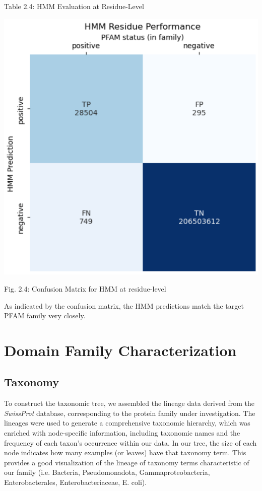 \documentclass[10pt,twocolumn,letterpaper]{article}
\begin{document}
\begin{center}
    \small{Table 2.4: HMM Evaluation at Residue-Level}
\end{center}

\begin{center}
    \includegraphics[scale=0.45]{report/img/hmm_res_performance.png}
\end{center}

\begin{center}
    \small{Fig. 2.4: Confusion Matrix for HMM at residue-level}
\end{center}

As indicated by the confusion matrix, the HMM predictions match the target PFAM family very closely.

\section{Domain Family Characterization}

\subsection{Taxonomy}

To construct the taxonomic tree, we assembled the lineage data derived from the \textit{SwissProt} database, corresponding to the protein family under investigation. The lineages were used to generate a comprehensive taxonomic hierarchy, which was enriched with node-specific information, including taxonomic names and the frequency of each taxon's occurrence within our data. In our tree, the size of each node indicates how many examples (or leaves) have that taxonomy term. This provides a good visualization of the lineage of taxonomy terms characteristic of our family (i.e. Bacteria, Pseudomonadota, Gammaproteobacteria, Enterobacterales, Enterobacteriaceae, E. coli). \\
\end{document}

